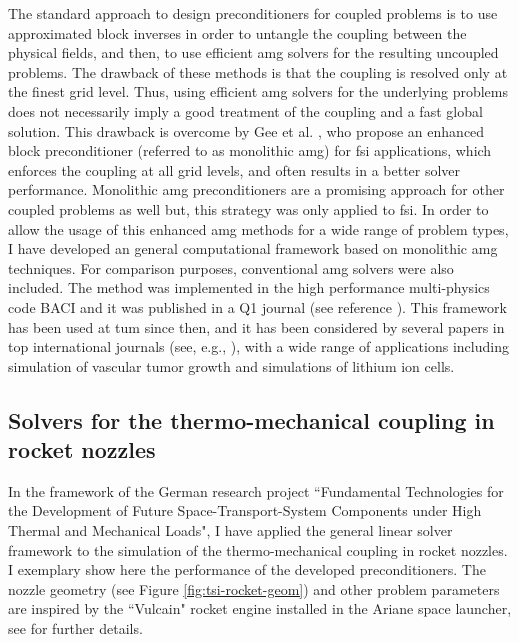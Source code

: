 \documentclass{article}
\newcommand{\bemph}[1]{#1}
\begin{document}
The standard approach to design preconditioners for coupled problems is to use approximated block inverses in order to untangle the coupling between the physical fields, and then, to use efficient \ac{amg} solvers for the resulting uncoupled problems. The drawback of these methods is that the coupling is resolved only at the finest grid level. Thus, using efficient \ac{amg} solvers for the underlying problems does not necessarily imply a good treatment of the coupling and a fast global solution. This drawback is overcome by Gee et al. \cite{gee_2011}, who propose an enhanced block preconditioner (referred to as monolithic \ac{amg}) for \ac{fsi} applications, which enforces the coupling at all grid levels, and often results in a better solver performance. Monolithic \ac{amg} preconditioners are a promising approach for other coupled problems as well but, this strategy was only applied to \ac{fsi}. In order to allow the usage of this enhanced \ac{amg} methods for a wide range of problem types, \bemph{I have developed an general computational framework based on monolithic \ac{amg} techniques}. For comparison purposes, conventional \ac{amg} solvers were also included. The method was implemented in the high performance multi-physics code BACI and \bemph{it was published in a Q1 journal} (see reference \cite{verdugo_2016}). This framework has been used at \ac{tum} since then, and \bemph{it has been considered by several papers in top international journals} (see, e.g., \cite{kremheller_2018}\cite{fang_2018}), with a wide range of applications including  simulation of vascular tumor growth and simulations of lithium ion cells.


\subsection{Solvers for the thermo-mechanical coupling in rocket nozzles}

In the framework of the \bemph{German research project} ``Fundamental Technologies for the Development of Future Space-Transport-System Components under High Thermal and Mechanical Loads", I have applied the general linear solver framework to the simulation of the thermo-mechanical coupling in rocket nozzles. I exemplary show here the performance of the developed preconditioners. The nozzle geometry  (see Figure \ref{fig:tsi-rocket-geom}) and other problem parameters are inspired by the ``Vulcain" rocket engine installed in the Ariane space launcher, see  \cite{verdugo_2016} for further details.
\end{document}
